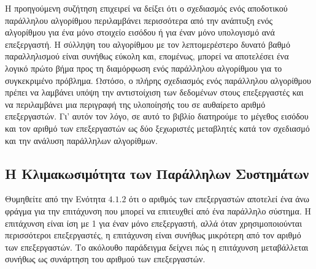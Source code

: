 \documentclass[12pt,a4paper]{article} %
\begin{document}
Η προηγούμενη συζήτηση επιχειρεί να δείξει ότι ο σχεδιασμός ενός 
αποδοτικού παράλληλου αλγορίθμου περιλαμβάνει περισσότερα από την 
ανάπτυξη ενός αλγορίθμου για ένα μόνο στοιχείο εισόδου ή για έναν μόνο 
υπολογισμό ανά επεξεργαστή. Η σύλληψη του αλγορίθμου με τον λεπτομερέστερο 
δυνατό βαθμό παραλληλισμού είναι συνήθως εύκολη και, επομένως, μπορεί να 
αποτελέσει ένα λογικό πρώτο βήμα προς τη διαμόρφωση ενός παράλληλου 
αλγορίθμου για το συγκεκριμένο πρόβλημα. Ωστόσο, ο πλήρης σχεδιασμός ενός 
παράλληλου αλγορίθμου πρέπει να λαμβάνει υπόψη την αντιστοίχιση των 
δεδομένων στους επεξεργαστές και να περιλαμβάνει μια περιγραφή της 
υλοποίησής του σε αυθαίρετο αριθμό επεξεργαστών. Γι’ αυτόν τον λόγο, σε 
αυτό το βιβλίο διατηρούμε το μέγεθος εισόδου και τον αριθμό των 
επεξεργαστών ως δύο ξεχωριστές μεταβλητές κατά τον σχεδιασμό και την 
ανάλυση παράλληλων αλγορίθμων.

\subsection{Η Κλιμακωσιμότητα των Παράλληλων Συστημάτων}
Θυμηθείτε από την Ενότητα $4.1.2$ ότι ο αριθμός των επεξεργαστών αποτελεί 
ένα άνω φράγμα για την επιτάχυνση που μπορεί να επιτευχθεί από ένα 
παράλληλο σύστημα. Η επιτάχυνση είναι ίση με 1 για έναν μόνο επεξεργαστή, 
αλλά όταν χρησιμοποιούνται περισσότεροι επεξεργαστές, η επιτάχυνση είναι 
συνήθως μικρότερη από τον αριθμό των επεξεργαστών. Το ακόλουθο παράδειγμα 
δείχνει πώς η επιτάχυνση μεταβάλλεται συνήθως ως συνάρτηση του αριθμού 
των επεξεργαστών.
\end{document}

